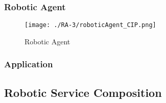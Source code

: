 \subsubsection{Robotic Agent} %
\begin{figure}[ht!]
 \centering
 \texttt{[image: ./RA-3/roboticAgent\_CIP.png]}
 \caption{Robotic Agent}
 \label{fig:roboticagent_cip}
\end{figure}

\subsubsection{Application} %

\subsection{Robotic Service Composition}
